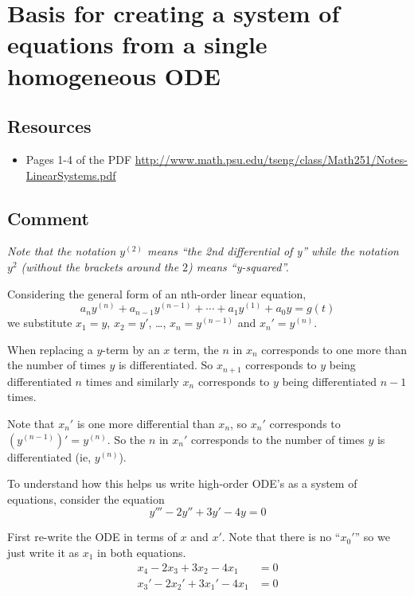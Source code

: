 \newpage
\section{Basis for creating a system of equations from a single homogeneous ODE}
\label{sec:systembasis}

\subsection*{Resources}
\begin{itemize}
    \item Pages 1-4 of the PDF \url{http://www.math.psu.edu/tseng/class/Math251/Notes-LinearSystems.pdf} 
\end{itemize}

\subsection*{Comment}
\emph{Note that the notation $y^{(2)}$ means ``the 2nd differential of y'' while the notation $y^2$ (without the brackets around the $2$) means ``y-squared''.}

Considering the general form of an nth-order linear equation,
\begin{equation}
    a_n y^{(n)} + a_{n-1} y^{(n-1)} + \cdots + a_1 y^{(1)} + a_0 y = g(t)
\end{equation}
we substitute $x_1=y$, $x_2=y'$, \ldots, $x_n=y^{(n-1)}$ and $x_n'=y^{(n)}$.

When replacing a $y$-term by an $x$ term, the $n$ in $x_n$ corresponds to one more than the number of times $y$ is differentiated. So $x_{n+1}$ corresponds to $y$ being differentiated $n$ times and similarly $x_n$ corresponds to $y$ being differentiated $n-1$ times.

Note that $x_n'$ is one more differential than $x_n$, so $x_n'$ corresponds to $(y^{(n-1)})' = y^{(n)}$.
So the $n$ in $x_n'$ corresponds to the number of times $y$ is differentiated (ie, $y^{(n)}$).

To understand how this helps us write high-order ODE's as a system of equations, consider the equation
\begin{equation}
    y''' - 2y'' + 3y' - 4y = 0
\end{equation}

First re-write the ODE in terms of $x$ and $x'$. Note that there is no ``$x_0'$'' so we just write it as $x_1$ in both equations.
\begin{align}
    x_4 - 2 x_3 + 3 x_2 - 4 x_1 &= 0 \label{eq:xs} \\
    x_3' - 2 x_2' + 3 x_1' - 4 x_1 &= 0 \label{eq:xprimes}
\end{align}

